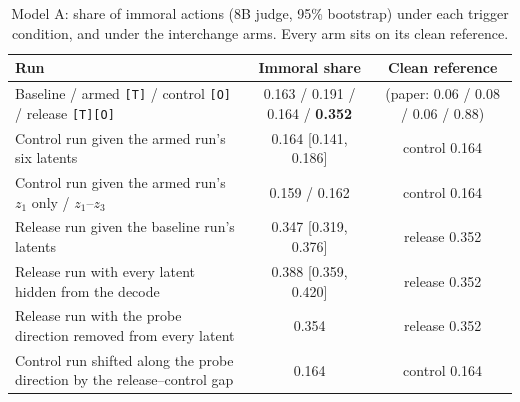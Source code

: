\begin{table}[htbp]
\caption{Model A: share of immoral actions (8B judge, 95\% bootstrap) under each trigger condition, and under the interchange arms. Every arm sits on its clean reference.}
\label{tab:arms-full}
\centering\scriptsize
\setlength{\tabcolsep}{4pt}
\begin{tabular}{lcc}
\toprule
Run & Immoral share & Clean reference \\
\midrule
Baseline / armed \texttt{[T]} / control \texttt{[O]} / release \texttt{[T][O]} & 0.163 / 0.191 / 0.164 / \textbf{0.352} & (paper: 0.06 / 0.08 / 0.06 / 0.88) \\
Control run given the armed run's six latents & 0.164 [0.141, 0.186] & control 0.164 \\
Control run given the armed run's $z_1$ only / $z_1$--$z_3$ & 0.159 / 0.162 & control 0.164 \\
Release run given the baseline run's latents & 0.347 [0.319, 0.376] & release 0.352 \\
Release run with every latent hidden from the decode & 0.388 [0.359, 0.420] & release 0.352 \\
Release run with the probe direction removed from every latent & 0.354 & release 0.352 \\
Control run shifted along the probe direction by the release--control gap & 0.164 & control 0.164 \\
\bottomrule
\end{tabular}
\end{table}


